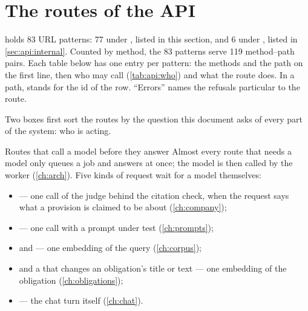 \section{The routes of the API}\label{sec:api:routes}

 holds 83 URL patterns: 77 under , listed in this section, and 6
under , listed in \cref{sec:api:internal}. Counted by method, the 83
patterns serve 119 method--path pairs. Each table below has one entry per pattern: the methods
and the path on the first line, then who may call (\cref{tab:api:who}) and what the route does.
In a path,  stands for the id of the row. \enquote{Errors} names the refusals
particular to the route.

Two boxes first sort the routes by the question this document asks of every part of the
system: who is acting.

\begin{aibox}{Routes that call a model before they answer}
Almost every route that needs a model only queues a job and answers at once; the model is then
called by the worker (\cref{ch:arch}). Five kinds of request wait for a model themselves:
\begin{itemize}
  \item {} --- one call of the judge behind the citation
    check, when the request says what a provision is claimed to be about (\cref{ch:company});
  \item {} --- one call with a prompt under test
    (\cref{ch:prompts});
  \item {} and  --- one
    embedding of the query (\cref{ch:corpus});
  \item {} and a  that changes an obligation's title or
    text --- one embedding of the obligation (\cref{ch:obligations});
  \item {} --- the chat turn itself (\cref{ch:chat}).
\end{itemize}
\end{aibox}

